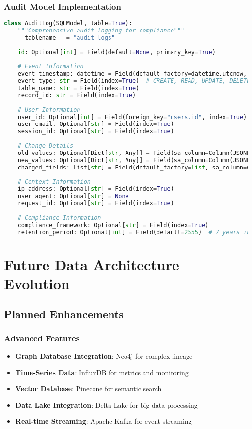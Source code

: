 \subsubsection{Audit Model Implementation}
\begin{lstlisting}[language=Python, caption=Audit Trail Model]
class AuditLog(SQLModel, table=True):
    """Comprehensive audit logging for compliance"""
    __tablename__ = "audit_logs"
    
    id: Optional[int] = Field(default=None, primary_key=True)
    
    # Event Information
    event_timestamp: datetime = Field(default_factory=datetime.utcnow, index=True)
    event_type: str = Field(index=True)  # CREATE, READ, UPDATE, DELETE
    table_name: str = Field(index=True)
    record_id: str = Field(index=True)
    
    # User Information
    user_id: Optional[int] = Field(foreign_key="users.id", index=True)
    user_email: Optional[str] = Field(index=True)
    session_id: Optional[str] = Field(index=True)
    
    # Change Details
    old_values: Optional[Dict[str, Any]] = Field(sa_column=Column(JSONB))
    new_values: Optional[Dict[str, Any]] = Field(sa_column=Column(JSONB))
    changed_fields: List[str] = Field(default_factory=list, sa_column=Column(JSON))
    
    # Context Information
    ip_address: Optional[str] = Field(index=True)
    user_agent: Optional[str] = None
    request_id: Optional[str] = Field(index=True)
    
    # Compliance Information
    compliance_framework: Optional[str] = Field(index=True)
    retention_period: Optional[int] = Field(default=2555)  # 7 years in days
\end{lstlisting}

\section{Future Data Architecture Evolution}

\subsection{Planned Enhancements}

\subsubsection{Advanced Features}
\begin{itemize}
    \item \textbf{Graph Database Integration}: Neo4j for complex lineage
    \item \textbf{Time-Series Data}: InfluxDB for metrics and monitoring
    \item \textbf{Vector Database}: Pinecone for semantic search
    \item \textbf{Data Lake Integration}: Delta Lake for big data processing
    \item \textbf{Real-time Streaming}: Apache Kafka for event streaming
\end{itemize}

